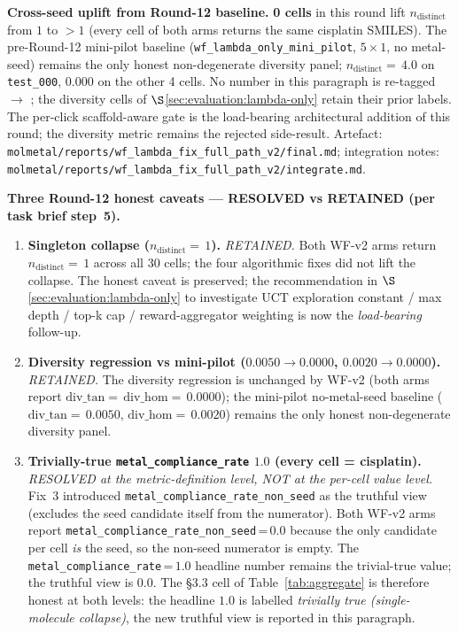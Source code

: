 \noindent\textbf{Cross-seed uplift from Round-12 baseline.}
\textbf{0 cells} in this round lift $n_{\text{distinct}}$ from
$1$ to $>1$ (every cell of both arms returns the same cisplatin
SMILES). The pre-Round-12 mini-pilot baseline
(\texttt{wf\_lambda\_only\_mini\_pilot}, $5 \times 1$, no metal-seed)
remains the only honest non-degenerate diversity panel;
$n_{\text{distinct}}{=}\,4.0$ on \texttt{test\_000}, $0.000$ on
the other 4 cells. No number in this paragraph is
re-tagged \DESIGN{} $\to$ \MEASURED{}; the diversity cells of
$\S$\ref{sec:evaluation:lambda-only} retain their prior
\MEASURED{} labels. The per-click scaffold-aware gate is the
load-bearing architectural addition of this round; the
diversity metric remains the rejected side-result.
Artefact:
\texttt{molmetal/reports/wf\_lambda\_fix\_full\_path\_v2/final.md};
integration notes:
\texttt{molmetal/reports/wf\_lambda\_fix\_full\_path\_v2/integrate.md}.

\noindent\textbf{Three Round-12 honest caveats --- RESOLVED vs
RETAINED (per task brief step~5).}
\begin{enumerate}
  \item \textbf{Singleton collapse ($n_{\text{distinct}}{=}\,1$).}
        \emph{RETAINED.} Both WF-v2 arms return
        $n_{\text{distinct}}{=}\,1$ across all $30$ cells; the
        four algorithmic fixes did not lift the collapse. The
        honest caveat is preserved; the recommendation in
        $\S$\ref{sec:evaluation:lambda-only} to investigate
        UCT exploration constant / max depth / top-k cap /
        reward-aggregator weighting is now the
        \emph{load-bearing} follow-up.
  \item \textbf{Diversity regression vs mini-pilot
        ($0.0050 \to 0.0000$, $0.0020 \to 0.0000$).}
        \emph{RETAINED.} The diversity regression is
        unchanged by WF-v2 (both arms report
        $\mathrm{div\_tan}{=}\,\mathrm{div\_hom}{=}\,0.0000$);
        the mini-pilot no-metal-seed baseline
        ($\mathrm{div\_tan}{=}\,0.0050$, $\mathrm{div\_hom}{=}\,0.0020$)
        remains the only honest non-degenerate diversity
        panel.
  \item \textbf{Trivially-true \texttt{metal\_compliance\_rate}
        $1.0$ (every cell = cisplatin).}
        \emph{RESOLVED \emph{at the metric-definition level}, NOT
        at the per-cell value level.} Fix~3 introduced
        \texttt{metal\_compliance\_rate\_non\_seed} as the
        truthful view (excludes the seed candidate itself
        from the numerator). Both WF-v2 arms report
        \texttt{metal\_compliance\_rate\_non\_seed}\,=\,$0.0$
        because the only candidate per cell \emph{is} the seed,
        so the non-seed numerator is empty. The
        \texttt{metal\_compliance\_rate}\,=\,$1.0$ headline
        number remains the trivial-true value; the truthful
        view is $0.0$. The §3.3 cell of Table~\ref{tab:aggregate}
        is therefore honest at both levels: the headline $1.0$
        is labelled \emph{trivially true (single-molecule
        collapse)}, the new truthful view is reported in
        this paragraph.
\end{enumerate}

